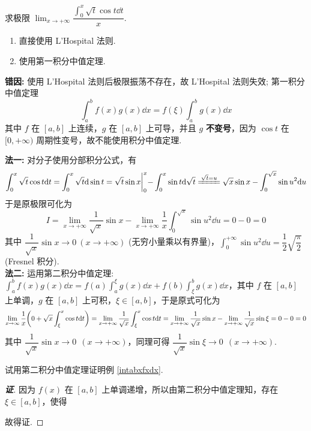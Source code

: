 \begin{example}
    求极限 $\displaystyle\lim_{x\to+\infty}\dfrac{\displaystyle\int_{0}^{x}\sqrt{t}\cos t\dd t}{x}.$
\end{example}
\begin{errorSolution}
    \begin{enumerate}[label=(\arabic{*})]
        \item 直接使用 L'Hospital 法则.
        \item 使用第一积分中值定理.
    \end{enumerate}
    \textbf{错因: }使用 L'Hospital 法则后极限振荡不存在，故 L'Hospital 法则失效; 第一积分中值定理 $$\displaystyle\int_{a}^{b}f(x)g(x)\dd x=f(\xi)\int_{a}^{b}g(x)\dd x$$
    其中 $f$ 在 $[a,b]$ 上连续，$g$ 在 $[a,b]$ 上可导，并且 $g$ \textbf{不变号}，因为 $\cos t$ 在 $[0,+\infty)$ 周期性变号，故不能使用积分中值定理.\\
\end{errorSolution}
\begin{solution}
    \textbf{法一: }对分子使用分部积分公式，有
    $$\int_{0}^{x}\sqrt{t}\cos t\dd t=\int_{0}^{x}\sqrt{t}\dd \sin t=\sqrt{t}\sin x\biggl |_{0}^{x}-\int_{0}^{x}\sin t\dd \sqrt{t} \xlongequal{\sqrt{t}=u}\sqrt{x}\sin x-\int_{0}^{\sqrt{x}}\sin u^2\dd u$$
    于是原极限可化为 $$I=\lim_{x\to+\infty}\dfrac{1}{\sqrt{x}}\sin x-\lim_{x\to+\infty}\dfrac{1}{x}\int_{0}^{\sqrt{x}}\sin u^2\dd u=0-0=0$$
    其中 $\dfrac{1}{\sqrt{x}}\sin x\to0~(x\to+\infty)$ (无穷小量乘以有界量)，$\displaystyle\int_{0}^{+\infty}\sin u^2\dd u=\dfrac{1}{2}\sqrt{\dfrac{\pi}{2}}$ (Fresnel 积分).\\
    \textbf{法二: }运用第二积分中值定理: $\displaystyle\int_{a}^{b}f(x)g(x)\dd x=f(a)\int_{a}^{\xi}g(x)\dd x+f(b)\int_{\xi}^{b}g(x)\dd x$，其中 $f$ 在 $[a,b]$ 上单调，$g$ 在 $[a,b]$ 上可积，$\xi\in[a,b]$，于是原式可化为
    $$\lim_{x\to\infty}\dfrac{1}{x}\qty(0+\sqrt{x}\int_{\xi}^{x}\cos t\dd t)=\lim_{x\to+\infty}\dfrac{1}{\sqrt{x}}\int_{\xi}^{x}\cos t\dd t=\lim_{x\to+\infty}\dfrac{1}{\sqrt{x}}\sin x-\lim_{x\to+\infty}\dfrac{1}{\sqrt{x}}\sin\xi=0-0=0$$
    其中 $\dfrac{1}{\sqrt{x}}\sin x\to0~~(x\to+\infty)$，同理可得 $\dfrac{1}{\sqrt{x}}\sin\xi\to0~~(x\to+\infty)$.
\end{solution}

\begin{example}
    试用第二积分中值定理证明例 \ref{intabxfxdx}.
\end{example}
\begin{proof}[{\songti \textbf{证}}]
    因为 $f(x)$ 在 $[a,b]$ 上单调递增，所以由第二积分中值定理知，存在 $\xi\in[a,b]$，使得
    故得证.
\end{proof}

